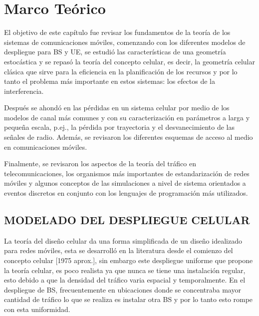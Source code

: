 
\chapter{Marco Teórico} %

\label{Chapter2} 

El objetivo de este capítulo fue revisar los fundamentos de la teoría de los sistemas de comunicaciones móviles, comenzando con los diferentes modelos de despliegue para BS y UE, se estudió las características de una geometría estocástica y se repasó la teoría del concepto celular, es decir, la geometría celular clásica que sirve para la eficiencia en la planificación de los recursos y por lo tanto el problema más importante en estos sistemas: los efectos de la interferencia.\newline

Después se ahondó en las pérdidas en un sistema celular por medio de los modelos de canal más comunes y con su caracterización en parámetros a larga y pequeña escala, p.ej., la pérdida por trayectoria y el desvanecimiento de las señales de radio. Además, se revisaron los diferentes esquemas de acceso al medio en comunicaciones móviles.\newline

Finalmente, se revisaron los aspectos de la teoría del tráfico en telecomunicaciones, los organismos más importantes de estandarización de redes móviles y algunos conceptos de las simulaciones a nivel de sistema orientados a eventos discretos en conjunto con los lenguajes de programación más utilizados.\newline



\section{MODELADO DEL DESPLIEGUE CELULAR}

La teoría del diseño celular da una forma simplificada de un diseño idealizado para redes móviles, esta se desarrolló en la literatura desde el comienzo del concepto celular [1975 aprox.], sin embargo este despliegue uniforme que propone la teoría celular, es poco realista ya que nunca se tiene una instalación regular, esto debido a que la densidad del tráfico varia espacial y temporalmente. En el despliegue de BS, frecuentemente en ubicaciones donde se concentraba mayor cantidad de tráfico lo que se realiza es instalar otra BS y por lo tanto esto rompe con esta uniformidad.\newline

